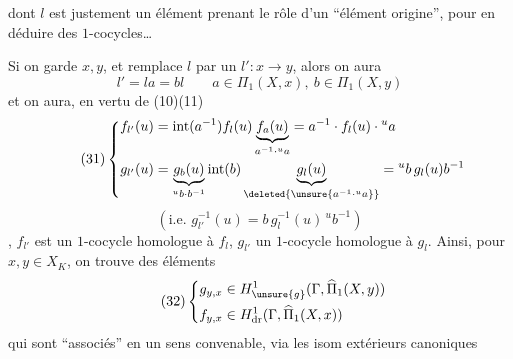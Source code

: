 dont $l$ est justement un élément prenant le rôle d'un ``élément origine'', pour en déduire des $1$-cocycles\ldots


Si on garde $x,y$, et  remplace $l$ par un $l':x\longrightarrow y$, alors  on aura
\[
l'=la=bl\qquad a\in\Pi_1(X,x),\ b\in\Pi_1(X,y)
\]
et on aura, en vertu de (10)(11)
\[
\tag{31}\left\{\begin{aligned}
f_{l'}(u)&=\operatorname{int}(a^{-1})f_l(u)\underbrace{f_a(u)}_{a^{-1}\cdot{}^ua}=a^{-1}\cdot f_l(u)\cdot{}^ua\\
g_{l'}(u)&=\underbrace{g_b(u)}_{{}^ub\cdot b^{-1}}\operatorname{int}(b)\underbrace{g_l(u)}_{\deleted{\unsure{a^{-1}\cdot{}^ua}}}={}^ub\,g_l(u)b^{-1}
\end{aligned}\right.
\]
\[
(\text{i.e. }g_{l'}^{-1}(u)=b\,g_l^{-1}(u)\,{}^ub^{-1})
\]
, $f_{l'}$ est un $1$-cocycle  homologue à $f_l$, $g_{l'}$ un $1$-cocycle  homologue à $g_l$. Ainsi, pour $x,y\in X_K$, on trouve des éléments
\[
\tag{32}\left\{\begin{aligned}
g_{y,x}&\in H^1_{\unsure{g}}(\Gamma,\widehat\Pi_1(X,y))\\
f_{y,x}&\in H^1_{\mathrm{dr}}(\Gamma,\widehat\Pi_1(X,x))
\end{aligned}\right.
\]
 qui sont ``associés'' en un sens convenable, via les isom extérieurs canoniques

